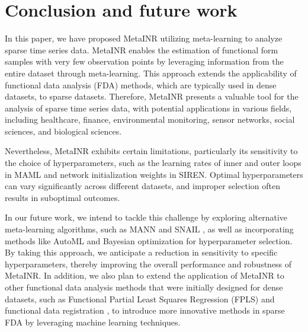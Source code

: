 \documentclass{article}
\begin{document}
\section{Conclusion and future work}
In this paper, we have proposed MetaINR utilizing meta-learning to analyze sparse time series data. 
MetaINR enables the estimation of functional form samples with very few observation points by leveraging information from the entire dataset through meta-learning. 
This approach extends the applicability of functional data analysis (FDA) methods, which are typically used in dense datasets, to sparse datasets. 
Therefore, MetaINR presents a valuable tool for the analysis of sparse time series data, with potential applications in various fields, 
including healthcare, finance, environmental monitoring, sensor networks, social sciences, and biological sciences.  


Nevertheless, MetaINR exhibits certain limitations, particularly its sensitivity to the choice of hyperparameters, 
such as the learning rates of inner and outer loops in MAML and network initialization weights in SIREN. 
Optimal hyperparameters can vary significantly across different datasets, 
and improper selection often results in suboptimal outcomes.

In our future work, 
we intend to tackle this challenge by exploring alternative meta-learning algorithms, 
such as MANN \cite{santoro2016meta} and SNAIL \cite{mishra2017simple}, 
as well as incorporating methods like AutoML \cite{he2021automl} and Bayesian optimization \cite{wu2019hyperparameter} for hyperparameter selection.
By taking this approach, we anticipate a reduction in sensitivity to specific hyperparameters, thereby improving the overall performance and robustness of MetaINR.
In addition, we also plan to extend the application of MetaINR to other functional data analysis methods that were initially designed for dense datasets, such as Functional Partial Least Squares Regression (FPLS) \cite{reiss2007functional} and functional data registration \cite{srivastava2011registration},
to introduce more innovative methods in sparse FDA by leveraging machine learning techniques.
\end{document}
